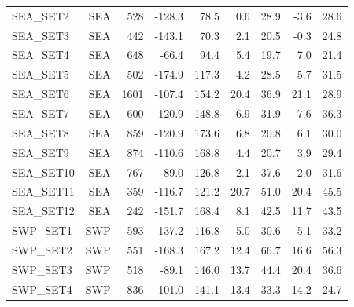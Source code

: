 \documentclass[final]{agujournal2019}
\begin{document}
\begin{longtable}[]{@{}lrrrrrrrr@{}}
SEA\_SET2 & SEA & 528 & -128.3 & 78.5 & 0.6 & 28.9 & -3.6 & 28.6 \\
SEA\_SET3 & SEA & 442 & -143.1 & 70.3 & 2.1 & 20.5 & -0.3 & 24.8 \\
SEA\_SET4 & SEA & 648 & -66.4 & 94.4 & 5.4 & 19.7 & 7.0 & 21.4 \\
SEA\_SET5 & SEA & 502 & -174.9 & 117.3 & 4.2 & 28.5 & 5.7 & 31.5 \\
SEA\_SET6 & SEA & 1601 & -107.4 & 154.2 & 20.4 & 36.9 & 21.1 & 28.9 \\
SEA\_SET7 & SEA & 600 & -120.9 & 148.8 & 6.9 & 31.9 & 7.6 & 36.3 \\
SEA\_SET8 & SEA & 859 & -120.9 & 173.6 & 6.8 & 20.8 & 6.1 & 30.0 \\
SEA\_SET9 & SEA & 874 & -110.6 & 168.8 & 4.4 & 20.7 & 3.9 & 29.4 \\
SEA\_SET10 & SEA & 767 & -89.0 & 126.8 & 2.1 & 37.6 & 2.0 & 31.6 \\
SEA\_SET11 & SEA & 359 & -116.7 & 121.2 & 20.7 & 51.0 & 20.4 & 45.5 \\
SEA\_SET12 & SEA & 242 & -151.7 & 168.4 & 8.1 & 42.5 & 11.7 & 43.5 \\
SWP\_SET1 & SWP & 593 & -137.2 & 116.8 & 5.0 & 30.6 & 5.1 & 33.2 \\
SWP\_SET2 & SWP & 551 & -168.3 & 167.2 & 12.4 & 66.7 & 16.6 & 56.3 \\
SWP\_SET3 & SWP & 518 & -89.1 & 146.0 & 13.7 & 44.4 & 20.4 & 36.6 \\
SWP\_SET4 & SWP & 836 & -101.0 & 141.1 & 13.4 & 33.3 & 14.2 & 24.7 \\
\end{longtable}

\clearpage
\end{document}
